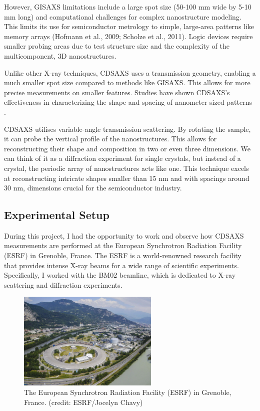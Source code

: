 \medskip

However, GISAXS limitations include a large spot size (50-100 mm wide by 5-10 mm long) and
computational challenges for complex nanostructure modeling. This limits its use for 
semiconductor metrology to simple, large-area patterns like memory arrays (Hofmann et al.,
2009; Scholze et al., 2011). Logic devices require smaller probing areas due to test structure 
size and the complexity of the multicomponent, 3D nanostructures. \cite{phd_freychet}

\medskip

Unlike other X-ray techniques, CDSAXS uses a transmission geometry, enabling a much smaller
spot size compared to methods like GISAXS. This allows for more precise measurements on smaller
features. Studies have shown CDSAXS's effectiveness in characterizing the shape and spacing of
nanometer-sized patterns \cite{sunday_2015}.

\medskip
CDSAXS  utilises variable-angle transmission scattering. By rotating the sample, it can probe the vertical profile of the nanostructures. This allows 
for reconstructing their shape and composition in two or even three dimensions.
We can think of it as a diffraction experiment for single crystals, but instead of a crystal, the 
periodic array of nanostructures acts like one. This technique excels at reconstructing 
intricate shapes smaller than 15 nm and with spacings around 30 nm, dimensions crucial for 
the semiconductor industry. \cite{first_cdsaxs_article}


\subsection{Experimental Setup}

During this project, I had the opportunity to work and observe how CDSAXS 
measurements are performed at the European Synchrotron Radiation Facility (ESRF)
in Grenoble, France. The ESRF is a world-renowned research facility that provides
intense X-ray beams for a wide range of scientific experiments. Specifically,
I worked with the BM02 beamline, which is dedicated to X-ray scattering and
   diffraction experiments.

\begin{figure}[h]
\centering
\includegraphics[width=0.6\textwidth]{images/esrf.jpg}
\caption{The European Synchrotron Radiation Facility (ESRF) in Grenoble, France. (credit: ESRF/Jocelyn Chavy)}
\label{fig
}
\end{figure}

